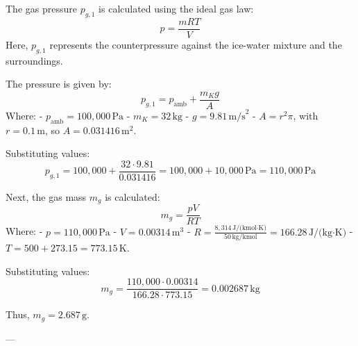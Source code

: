 The gas pressure \( p_{g,1} \) is calculated using the ideal gas law:  
\[
p = \frac{mRT}{V}
\]  
Here, \( p_{g,1} \) represents the counterpressure against the ice-water mixture and the surroundings.  

The pressure is given by:  
\[
p_{g,1} = p_{\text{amb}} + \frac{m_K g}{A}
\]  
Where:  
- \( p_{\text{amb}} = 100,000 \, \text{Pa} \)  
- \( m_K = 32 \, \text{kg} \)  
- \( g = 9.81 \, \text{m/s}^2 \)  
- \( A = r^2 \pi \), with \( r = 0.1 \, \text{m} \), so \( A = 0.031416 \, \text{m}^2 \).  

Substituting values:  
\[
p_{g,1} = 100,000 + \frac{32 \cdot 9.81}{0.031416} = 100,000 + 10,000 \, \text{Pa} = 110,000 \, \text{Pa}
\]  

Next, the gas mass \( m_g \) is calculated:  
\[
m_g = \frac{p V}{R T}
\]  
Where:  
- \( p = 110,000 \, \text{Pa} \)  
- \( V = 0.00314 \, \text{m}^3 \)  
- \( R = \frac{8,314 \, \text{J/(kmol·K)}}{50 \, \text{kg/kmol}} = 166.28 \, \text{J/(kg·K)} \)  
- \( T = 500 + 273.15 = 773.15 \, \text{K} \).  

Substituting values:  
\[
m_g = \frac{110,000 \cdot 0.00314}{166.28 \cdot 773.15} = 0.002687 \, \text{kg}
\]  

Thus, \( m_g = 2.687 \, \text{g} \).  

---